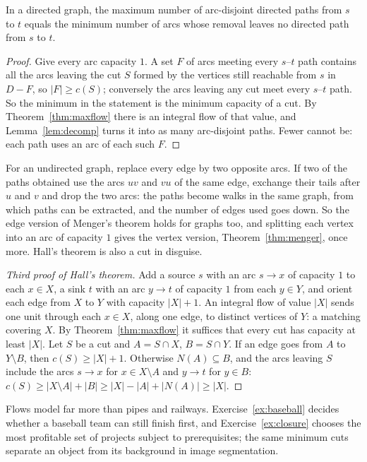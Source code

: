 \begin{corollary}\label{cor:edgemenger}
In a directed graph, the maximum number of arc-disjoint directed paths from $s$ to $t$ equals the minimum number of arcs whose
removal leaves no directed path from $s$ to $t$.
\end{corollary}
\begin{proof}
Give every arc capacity $1$. A set $F$ of arcs meeting every $s$--$t$ path contains all the arcs leaving the cut $S$ formed by the
vertices still reachable from $s$ in $D-F$, so $|F|\ge c(S)$; conversely the arcs leaving any cut meet every $s$--$t$ path. So the
minimum in the statement is the minimum capacity of a cut. By Theorem~\ref{thm:maxflow} there is an integral flow of that value, and
Lemma~\ref{lem:decomp} turns it into as many arc-disjoint paths. Fewer cannot be: each path uses an arc of each such $F$.
\end{proof}

For an undirected graph, replace every edge by two opposite arcs. If two of the paths obtained use the arcs $uv$ and $vu$ of the
same edge, exchange their tails after $u$ and $v$ and drop the two arcs: the paths become walks in the same graph, from which
paths can be extracted, and the number of edges used goes down. So the edge version of Menger's theorem holds for graphs too, and
splitting each vertex into an arc of capacity $1$ gives the vertex version, Theorem~\ref{thm:menger}, once more. Hall's theorem is
also a cut in disguise.

\begin{proof}[Third proof of Hall's theorem]
Add a source $s$ with an arc $s\to x$ of capacity $1$ to each $x\in X$, a sink $t$ with an arc $y\to t$ of capacity $1$ from each $y\in Y$, and
orient each edge from $X$ to $Y$ with capacity $|X|+1$. An integral flow of value $|X|$ sends one unit through each $x\in X$, along one edge,
to distinct vertices of $Y$: a matching covering $X$. By Theorem~\ref{thm:maxflow} it suffices that every cut has capacity at least
$|X|$. Let $S$ be a cut and $A=S\cap X$, $B=S\cap Y$. If an edge goes from $A$ to $Y\setminus B$, then $c(S)\ge|X|+1$. Otherwise $N(A)\subseteq B$,
and the arcs leaving $S$ include the arcs $s\to x$ for $x\in X\setminus A$ and $y\to t$ for $y\in B$:
$c(S)\ge|X\setminus A|+|B|\ge|X|-|A|+|N(A)|\ge|X|$.
\end{proof}

Flows model far more than pipes and railways. Exercise~\ref{ex:baseball} decides whether a baseball team can still finish first,
and Exercise~\ref{ex:closure} chooses the most profitable set of projects subject to prerequisites; the same minimum cuts separate
an object from its background in image segmentation.

